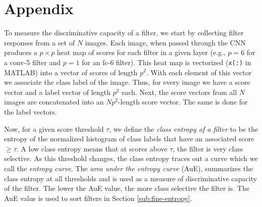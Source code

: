 \section*{Appendix}
\label{sub:app-entropy}
To measure the discriminative capacity of a filter, we start by collecting filter responses from a set of $N$ images.
Each image, when passed through the CNN produces a $p \times p$ heat map of scores for each filter in a given layer (e.g., $p = 6$ for a conv-5 filter and $p = 1$ for an fc-6 filter).
This heat map is vectorized (\texttt{x(:)} in MATLAB) into a vector of scores of length $p^2$. With each element of this vector we associate the class label of the image. 
Thus, for every image we have a score vector and a label vector of length $p^2$ each.
Next, the score vectors from all $N$ images are concatenated into an $Np^2$-length score vector.
The same is done for the label vectors.

Now, for a given score threshold $\tau$, we define the \emph{class entropy of a filter} to be the entropy of the normalized histogram of class labels that have an associated score $\geq \tau$.
A low class entropy means that at scores above $\tau$, the filter is very class selective.
As this threshold changes, the class entropy traces out a curve which we call the \emph{entropy curve}.
The \emph{area under the entropy curve} (AuE), summarizes the class entropy at all thresholds and is used as a measure of discriminative capacity of the filter. 
The lower the AuE value, the more class selective the filter is.
The AuE valus is used to sort filters in Section \ref{sub:fine-entropy}.




